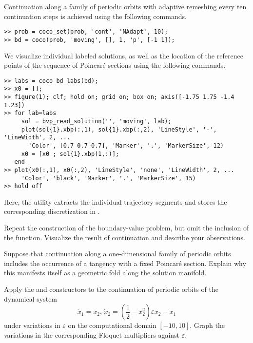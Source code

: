 Continuation along a family of periodic orbits with adaptive remeshing every ten continuation steps is achieved using the following commands.
\begin{lstlisting}[language=coco-highlight]
>> prob = coco_set(prob, 'cont', 'NAdapt', 10);
>> bd = coco(prob, 'moving', [], 1, 'p', [-1 1]);
\end{lstlisting}
We visualize individual labeled solutions, as well as the location of the reference points of the sequence of Poincar\'{e} sections using the following commands.
\begin{lstlisting}[language=coco-highlight]
>> labs = coco_bd_labs(bd); 
>> x0 = [];
>> figure(1); clf; hold on; grid on; box on; axis([-1.75 1.75 -1.4 1.23])
>> for lab=labs
     sol = bvp_read_solution('', 'moving', lab);
     plot(sol{1}.xbp(:,1), sol{1}.xbp(:,2), 'LineStyle', '-', 'LineWidth', 2, ...
       'Color', [0.7 0.7 0.7], 'Marker', '.', 'MarkerSize', 12)
     x0 = [x0 ; sol{1}.xbp(1,:)];
   end
>> plot(x0(:,1), x0(:,2), 'LineStyle', 'none', 'LineWidth', 2, ...
     'Color', 'black', 'Marker', '.', 'MarkerSize', 15)
>> hold off
\end{lstlisting}
Here, the  utility extracts the individual trajectory segments and stores the corresponding discretization in .
\newline
\begin{exercises}
\item Repeat the construction of the boundary-value problem, but omit the inclusion of the  function. Visualize the result of continuation and describe your observations.
\item Suppose that continuation along a one-dimensional family of periodic orbits includes the occurrence of a tangency with a fixed Poincar\'{e} section. Explain why this manifests itself as a geometric fold along the solution manifold.
\item Apply the  and  constructors to the continuation of periodic orbits of the dynamical system
\[
\dot{x}_1=x_2,\,\dot{x}_2=\left(\frac{1}{2}-x_2^2\right)\varepsilon x_2-x_1
\]
under variations in $\varepsilon$ on the computational domain $[-10,10]$. Graph the variations in the corresponding Floquet multipliers against $\varepsilon$.
\end{exercises}

